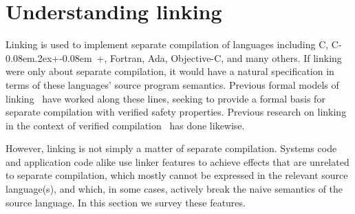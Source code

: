 \documentclass[preprint,10pt]{sigplanconf-pldi16}
\def\Cplusplus{C\kern-0.08em\raise.2ex\hbox{\footnotesize +\kern-0.08em +}}
\begin{document}





\section{Understanding linking}
Linking is used to implement separate compilation 
of languages including C, \Cplusplus{}, Fortran, Ada, Objective-C, and
many others.
If linking were only about separate compilation, it would have a natural specification
in terms of these languages' source program semantics.
Previous formal models of linking~\cite{cardelli-program-1997, glew-type-safe-1999, machkasova-calculus-2000, wells-equational-2000, fagorzi-calculus-2007}
have worked along these lines, 
seeking to provide a formal basis for separate compilation with verified safety properties.
Previous research on linking in the context of verified compilation~\cite{stewart-compositional-2015, kang-lightweight-2015} has done likewise.

However, linking is not simply a matter of separate compilation.
Systems code and application code alike 
use linker features to achieve effects that are unrelated to separate compilation,
which mostly cannot be expressed in the relevant source language(s), 
and which, in some cases, actively break the naive semantics of the source language.
In this section we survey these features.
\end{document}
